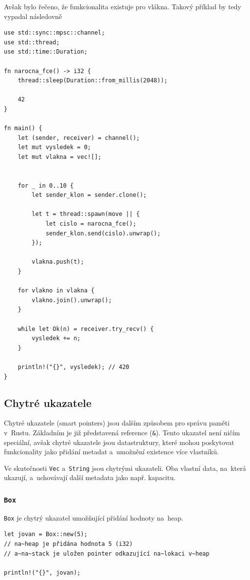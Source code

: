 \documentclass[a4paper, 12pt]{article} %
\newcommand{\rust}[1]{\texttt{#1}}
\begin{document}
            Avšak bylo řečeno, že funkcionalita existuje pro vlákna. Takový příklad by tedy vypadal následovně
            \begin{verbatim}
use std::sync::mpsc::channel;
use std::thread;
use std::time::Duration;

fn narocna_fce() -> i32 {
    thread::sleep(Duration::from_millis(2048));

    42
} 

fn main() {
    let (sender, receiver) = channel();
    let mut vysledek = 0;
    let mut vlakna = vec![];


    for _ in 0..10 {
        let sender_klon = sender.clone();

        let t = thread::spawn(move || {
            let cislo = narocna_fce();
            sender_klon.send(cislo).unwrap();
        });

        vlakna.push(t);
    }
    
    for vlakno in vlakna {
        vlakno.join().unwrap();
    }
    
    while let Ok(n) = receiver.try_recv() {
        vysledek += n;
    }

    println!("{}", vysledek); // 420
}
            \end{verbatim}
            \cite{kanaly}


    \subsection{Chytré ukazatele}
        Chytré ukazatele (smart pointers) jsou dalším způsobem pro správu paměti v~Rustu. Základním je již představená reference (\rust{&}). Tento ukazatel není ničím speciální, avšak chytré ukazatele jsou datastruktury, které mohou poskytovat funkcionality jako přidání metadat a~umožnění existence více vlastníků.
        
        Ve skutečnosti \rust{Vec} a~\rust{String} jsou chytrými ukazateli. Oba vlastní data, na~která ukazují, a~uchovávají další metadata jako např. kapacitu.
        
        \subsubsection*{\rust{Box}}
            \rust{Box} je chytrý ukazatel umožňující přidání hodnoty na~heap.
            \begin{verbatim}
let jovan = Box::new(5);
// na~heap je přidána hodnota 5 (i32)
// a~na~stack je uložen pointer odkazující na~lokaci v~heap

println!("{}", jovan);
            \end{verbatim}
            
\end{document}
